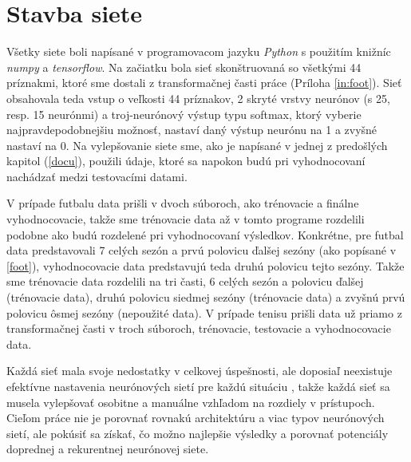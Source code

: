 \chapter{Stavba siete}

Všetky siete boli napísané v programovacom jazyku \textit{Python} s použitím knižníc \textit{numpy} a \textit{tensorflow}.
Na začiatku bola sieť skonštruovaná so všetkými 44 príznakmi, ktoré sme dostali z transformačnej časti práce (Príloha \ref{in:foot}).
Sieť obsahovala teda vstup o veľkosti 44 príznakov, 2 skryté vrstvy neurónov (s 25, resp. 15 neurónmi) a troj-neurónový výstup typu softmax, ktorý vyberie najpravdepodobnejšiu možnosť, nastaví daný výstup neurónu na 1 a zvyšné nastaví na 0.
Na vylepšovanie siete sme, ako je napísané v jednej z predošlých kapitol (\ref{docu}), použili údaje, ktoré sa napokon budú pri vyhodnocovaní nachádzať medzi testovacími datami. 

V prípade futbalu data prišli v dvoch súboroch, ako trénovacie a finálne vyhodnocovacie, takže sme trénovacie data až v tomto programe rozdelili podobne ako budú rozdelené pri vyhodnocovaní výsledkov. 
Konkrétne, pre futbal data predstavovali 7 celých sezón a prvú polovicu ďalšej sezóny (ako popísané v \ref{foot}), vyhodnocovacie data predstavujú teda druhú polovicu tejto sezóny. 
Takže sme trénovacie data rozdelili na tri časti, 6 celých sezón a polovicu ďalšej (trénovacie data), druhú polovicu siedmej sezóny (trénovacie data) a zvyšnú prvú polovicu ôsmej sezóny (nepoužité data).
V prípade tenisu prišli data už priamo z transformačnej časti v troch súboroch, trénovacie, testovacie a vyhodnocovacie data.

Každá sieť mala svoje nedostatky v celkovej úspešnosti, ale doposiaľ neexistuje efektívne nastavenia neurónových sietí pre každú situáciu \citep{gitgud}, takže každá sieť sa musela vylepšovať osobitne a manuálne vzhľadom na rozdiely v prístupoch.
Cieľom práce nie je porovnať rovnakú architektúru a viac typov neurónových sietí, ale pokúsiť sa získať, čo možno najlepšie výsledky a porovnať potenciály doprednej a rekurentnej neurónovej siete.


\iffalse
Pokus 1: bez formy (1-20, 31-44) (ešte práca s dropoutom) 
dropout po 2.(58%
dropout po 1. vrstve 9.7. 17:19 54,8%
Pokus 2: bez GPG -12 stĺpcov
Pokus 3: kombinácia (44-20)
\fi
